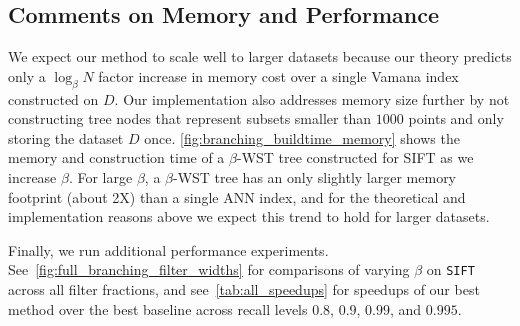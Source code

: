 \documentclass{article}
\theoremstyle{plain}
\theoremstyle{definition}
\theoremstyle{remark}
\newcommand{\julian}[1]{{\color{red}{\bf Julian:} #1}}
\newcommand{\datasetname}[1]{\texttt{#1}}
\begin{document}
\subsection{Comments on Memory and Performance}
We expect our method to scale well to larger datasets because our theory predicts only a $\log_\beta N$ factor increase in memory cost over a single Vamana index constructed on $D$. Our implementation also addresses memory size further by not constructing tree nodes that represent subsets smaller than $1000$ points and only storing the dataset $D$ once. \cref{fig:branching_buildtime_memory} shows the memory and construction time of a $\beta$-WST tree constructed for SIFT as we increase $\beta$. For large $\beta$, a $\beta$-WST tree has an only slightly larger memory footprint (about 2X) than a single ANN
index, and for the theoretical and implementation reasons above we expect this trend to hold for larger
datasets.


Finally, we run additional performance experiments. See~\cref{fig:full_branching_filter_widths} for comparisons of varying $\beta$ on \datasetname{SIFT} across all filter fractions, and see~\cref{tab:all_speedups} for speedups of our best method over the best baseline across recall levels $0.8$, $0.9$, $0.99$, and $0.995$.


\end{document}
